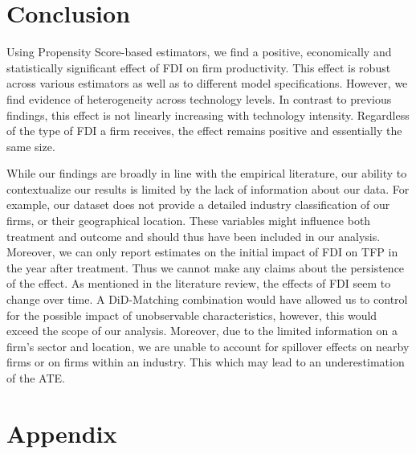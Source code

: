 \documentclass[a4paper,11pt]{scrartcl}
\newcommand{\sectionnumbering}[1]{%
  \setcounter{section}{0}%
   \renewcommand{\thesection}{\csname #1\endcsname{section}}}
\begin{document}
\section{Conclusion}

Using Propensity Score-based estimators, we find a positive, economically and statistically significant effect of FDI on firm productivity. This effect is robust across various estimators as well as to different model specifications. However, we find evidence of heterogeneity across technology levels. In contrast to previous findings, this effect is not linearly increasing with technology intensity. Regardless of the type of FDI a firm receives, the effect remains positive and essentially the same size.

While our findings are broadly in line with the empirical literature, our ability to contextualize our results is limited by the lack of information about our data. For example, our dataset does not provide a detailed industry classification of our firms, or their geographical location. These variables might influence both treatment and outcome and should thus have been included in our analysis. Moreover, we can only report estimates on the initial impact of FDI on TFP in the year after treatment. Thus we cannot make any claims about the persistence of the effect. As mentioned in the literature review, the effects of FDI seem to change over time. A DiD-Matching combination would have allowed us to control for the possible impact of unobservable characteristics, however, this would exceed the scope of our analysis. Moreover, due to the limited information on a firm's sector and location, we are unable to account for spillover effects on nearby firms or on firms within an industry. This which may lead to an underestimation of the ATE. 


\newpage

 
\newpage


\sectionnumbering{Roman}
\setcounter{page}{3} %

\appendix
\section{Appendix}
\end{document}
